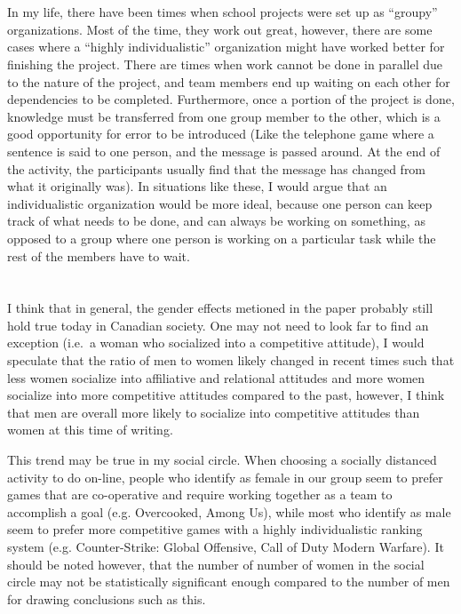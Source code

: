 \documentclass[letterpaper,12pt]{article}
\begin{document}
  \section{}
  In my life, there have been times when school projects were set up as
  ``groupy'' organizations.  Most of the time, they work out great, however,
  there are some cases where a ``highly individualistic'' organization  might
  have worked better for finishing the project. There are times when work
  cannot be done in parallel due to the nature of the project, and team members
  end up waiting on each other for dependencies to be completed. Furthermore,
  once a portion of the project is done, knowledge must be transferred from one
  group member to the other, which is a good opportunity for error to be
  introduced (Like the telephone game where a sentence is said to one person,
  and the message is passed around. At the end of the activity, the
  participants usually find that the message has changed from what it
  originally was). In situations like these, I would argue that an
  individualistic organization would be more ideal, because one person can keep
  track of what needs to be done, and can always be working on something, as
  opposed to a group where one person is working on a particular task while
  the rest of the members have to wait. 


  \section{}
  I think that in general, the gender effects metioned in the paper probably
  still hold true today in Canadian society. One may not need to look far to
  find an exception (i.e.\ a woman who socialized into a competitive attitude),
  I would speculate that the ratio of men to women likely changed in recent
  times such that less women socialize into affiliative and relational
  attitudes and more women socialize into more competitive attitudes compared
  to the past, however, I think that men are overall more likely to socialize
  into competitive attitudes than women at this time of writing.

  This trend may be true in my social circle.  When choosing a socially
  distanced activity to do on-line, people who identify as female in our group
  seem to prefer games that are co-operative and require working together as a
  team to accomplish a goal (e.g. Overcooked, Among Us), while most who
  identify as male seem to prefer more competitive games with a highly
  individualistic ranking system (e.g. Counter-Strike: Global Offensive, Call
  of Duty Modern Warfare). It should be noted however, that the number of
  number of women in the social circle may not be statistically significant
  enough compared to the number of men for drawing conclusions such as this.
\end{document}
